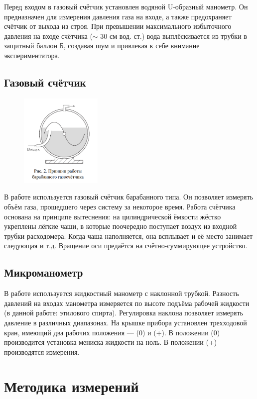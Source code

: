 \documentclass[15pt,a5paper,reqno]{article}
\begin{document}
    Перед входом в газовый счётчик установлен водяной U-образный манометр. Он предназначен для измерения давления газа на входе, а также предохраняет счётчик от выхода из строя. При превышении максимального избыточного давления на входе счётчика ($\sim$ 30 см вод. ст.) вода выплёскивается из трубки в защитный баллон Б, создавая шум и привлекая к себе внимание экспериментатора.
    
    \subsection{Газовый счётчик}
    \begin{figure}
        \includegraphics[width = 0.35\textwidth]{Рисунок 2.png}
    \end{figure}
    В работе используется газовый счётчик барабанного типа. Он позволяет измерять объём газа, прошедшего через систему за некоторое время. Работа счётчика основана на принципе вытеснения: на цилиндрической ёмкости жёстко укреплены лёгкие чаши, в которые поочередно поступает воздух из входной трубки расходомера. Когда чаша наполняется, она всплывает и её место занимает следующая и т.д. Вращение оси предаётся на счётно-суммирующее устройство.
    
    \subsection{Микроманометр}
    В работе используется жидкостный манометр с наклонной трубкой. Разность давлений на входах манометра измеряется по высоте подъёма рабочей жидкости (в данной работе: этилового спирта). Регулировка наклона позволяет измерять давление в различных диапазонах. На крышке прибора установлен трехходовой кран, имеющий два рабочих положения — (0) и (+). В положении (0) производится установка мениска жидкости на ноль. В положении (+) производятся измерения.
    
\section{Методика измерений}	
\end{document}
